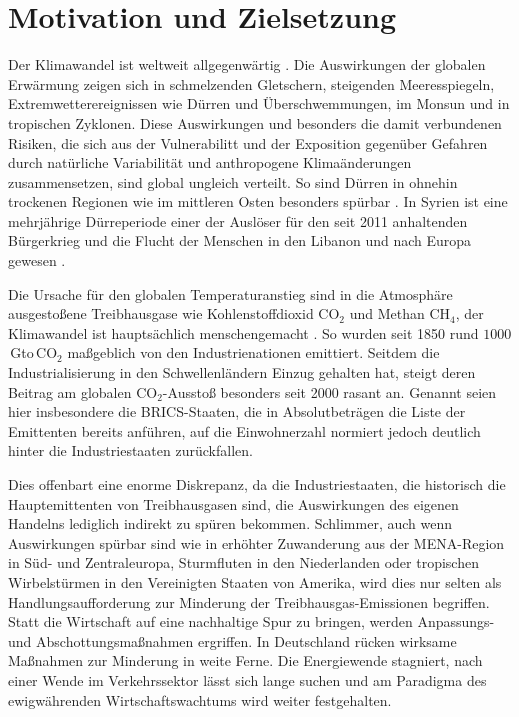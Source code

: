 \chapter{Motivation und Zielsetzung} \label{ch:motivation}

Der Klimawandel ist weltweit allgegenwärtig \citep{ipcc-2014}. Die Auswirkungen der globalen Erwärmung zeigen sich in schmelzenden Gletschern, steigenden Meeresspiegeln, Extremwetterereignissen wie Dürren und Überschwemmungen, im Monsun und in tropischen Zyklonen. Diese Auswirkungen und besonders die damit verbundenen Risiken, die sich aus der Vulnerabilitt und der Exposition gegenüber Gefahren durch natürliche Variabilität und anthropogene Klimaänderungen zusammensetzen, sind global ungleich verteilt. So sind Dürren in ohnehin trockenen Regionen wie im mittleren Osten besonders spürbar \citep{ipcc-wg2-2014}. In Syrien ist eine mehrjährige Dürreperiode einer der Auslöser für den seit 2011 anhaltenden Bürgerkrieg und die Flucht der Menschen in den Libanon und nach Europa gewesen \citep{gleick-2014}.  

Die Ursache für den globalen Temperaturanstieg sind in die Atmosphäre ausgestoßene Treibhausgase wie Kohlenstoffdioxid CO$_2$ und Methan CH$_4$, der Klimawandel ist hauptsächlich menschengemacht \citep{ipcc-wg1-2013}. So wurden seit 1850 rund $1000$\,Gto\,CO$_2$ maßgeblich von den Industrienationen emittiert. Seitdem die Industrialisierung in den Schwellenländern Einzug gehalten hat, steigt deren Beitrag am globalen CO$_2$-Ausstoß besonders seit 2000 rasant an. Genannt seien hier insbesondere die BRICS-Staaten, die in Absolutbeträgen die Liste der Emittenten bereits anführen, auf die Einwohnerzahl normiert jedoch deutlich hinter die Industriestaaten zurückfallen. \citep{ipcc-wg3-2014}

Dies offenbart eine enorme Diskrepanz, da die Industriestaaten, die historisch die Hauptemittenten von Treibhausgasen sind, die Auswirkungen des eigenen Handelns lediglich indirekt zu spüren bekommen. Schlimmer, auch wenn Auswirkungen spürbar sind wie in erhöhter Zuwanderung aus der MENA-Region in Süd- und Zentraleuropa, Sturmfluten in den Niederlanden oder tropischen Wirbelstürmen in den Vereinigten Staaten von Amerika, wird dies nur selten als Handlungsaufforderung zur Minderung der Treibhausgas-Emissionen begriffen. Statt die Wirtschaft auf eine nachhaltige Spur zu bringen, werden Anpassungs- und Abschottungsmaßnahmen ergriffen. In Deutschland rücken wirksame Maßnahmen zur Minderung in weite Ferne. Die Energiewende stagniert, nach einer Wende im Verkehrssektor lässt sich lange suchen und am Paradigma des ewigwährenden Wirtschaftswachtums wird weiter festgehalten. 

